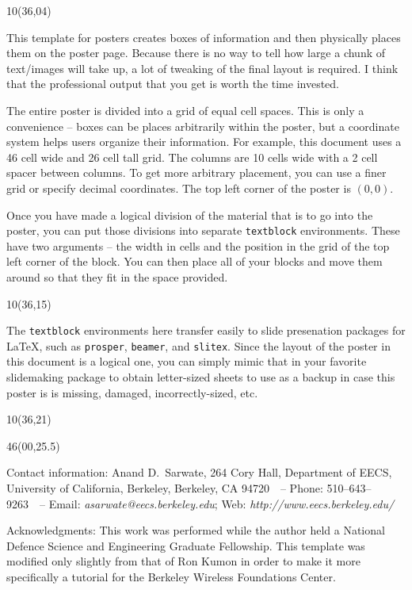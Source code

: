 \documentclass{article}
\def\CHead#1{\begin{center}\noindent{\LARGE\color{DarkBlue} #1}\end{center}}
\renewcommand{\footnotesize}{\fontsize{17.28}{22}\selectfont}
\renewcommand{\LARGE}{\fontsize{43}{54}\selectfont}
\begin{document}
\begin{textblock}{10}(36,04)
\CHead{Layout Details}
This template for posters creates boxes of information and then physically
places them on the poster page.  Because there is no way to tell how large
a chunk of text/images will take up, a lot of tweaking of the final layout
is required.  I think that the professional output that you get is 
worth the time invested.

The entire poster is divided into a grid of equal cell spaces.  This is
only a convenience -- boxes can be places arbitrarily within the poster,
but a coordinate system helps users organize their information.  For example,
this document uses a 46 cell wide and 26 cell tall grid.  The columns are
10 cells wide with a 2 cell spacer between columns.  To get more arbitrary
placement, you can use a finer grid or specify decimal coordinates.  The
top left corner of the poster is $(0,0)$.

Once you have made a logical division of the material that is to go into 
the poster, you can put those divisions into separate \texttt{textblock}
environments.  These have two arguments -- the width in cells and the 
position in the grid of the top left corner of the block.  You can then
place all of your blocks and move them around so that they fit in the
space provided.
\end{textblock}


\begin{textblock}{10}(36,15)
\CHead{Making a poster backup}
The \texttt{textblock} environments here transfer easily to slide
presenation packages for \LaTeX, such as \texttt{prosper}, \texttt{beamer},
and \texttt{slitex}.  Since the layout of the poster in this document is
a logical one, you can simply mimic that in your favorite slidemaking
package to obtain letter-sized sheets to use as a backup in case this
poster is is missing, damaged, incorrectly-sized, etc.

\end{textblock}


\begin{textblock}{10}(36,21)


\end{textblock}



\begin{textblock}{46}(00,25.5)
\begin{center}
{\footnotesize Contact information:
Anand D.~Sarwate, 264 Cory Hall, Department of EECS, University of California, Berkeley, Berkeley, CA 94720\ \ --
Phone: 510--643--9263\ \ -- 
Email: \textit{asarwate@eecs.berkeley.edu}; 
Web: \textit{http://www.eecs.berkeley.edu/}
}
\vspace{-0.75\baselineskip}

{\footnotesize Acknowledgments: This work was performed while the
author held a National Defence Science and Engineering Graduate
Fellowship.  This template was modified only slightly from that of Ron
Kumon in order to make it more specifically a tutorial for the
Berkeley Wireless Foundations Center.}
\end{center}
\end{textblock}
\end{document}
